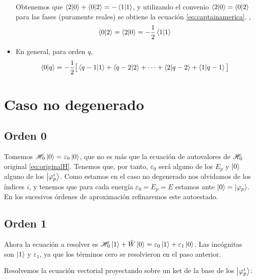 \begin{itemize}
{\begin{equation*}
\end{equation*}
 Obtenemos que $\braket{2}{0} + \braket{0}{2} = -\braket{1}{1}$, y
 utilizando el convenio $\braket{2}{0} = \braket{0}{2}$ para las fases
 (puramente reales) se obtiene la ecuación \eqref{eq:captainamerica}.
},
\begin{equation}
  \braket{0}{2} = \braket{2}{0} = - \frac{1}{2} \braket{1}{1}
  \label{eq:captainamerica}
\end{equation}
\item En general, para orden $q$,
\begin{equation}
  \braket{0}{q} = - \frac{1}{2}\big[ \braket{q-1}{1} +
    \braket{q-2}{2} + \cdots + \braket{2}{q-2} + \braket{1}{q-1}\big]
\end{equation}
\end{itemize}

\section{Caso no degenerado}

\subsection{Orden 0}
Tomemos $ \mathscr{H} _0 \ket{0} = \varepsilon_0 \ket{0}$, que no es más que la
ecuación de autovalores de $ \mathscr{H} _0$ original
\eqref{eq:originalH}. Tenemos que, por tanto, $\varepsilon_0$ será alguno
de los $E_p$ y $\ket{0}$ alguno de los $\ket{\varphi_p^i}$. Como estamos
en el caso no degenerado nos olvidamos de los índices $i$, y tenemos
que para cada energía $\varepsilon_0 = E_p = E$ estamos ante $\ket{0} =
\ket{\varphi_p}$. En los sucesivos órdenes de aproximación refinaremos
este autoestado.

\subsection{Orden 1}
Ahora la ecuación a resolver es $ \mathscr{H} _0 \ket{1} + \hat{W}
\ket{0} = \varepsilon_0 \ket{1} + \varepsilon_1 \ket{0} $. Las incógnitas son
$\ket{1}$ y $\varepsilon_1$, ya que los términos cero se resolvieron en el
paso anterior.

Resolvemos la ecuación vectorial proyectando sobre un ket de la base de los $\ket{\varphi_p^i}$:

